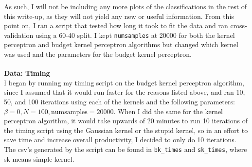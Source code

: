 \documentclass[submit]{harvardml}
\begin{document}
As such, I will not be including any more plots of the classifications in the rest of this write-up, as they will not yield any new or useful information. From this point on, I ran a script that tested how long it took to fit the data and ran cross-validation using a 60-40 split. I kept \texttt{numsamples} at 20000 for both the kernel perceptron and budget kernel perceptron algorithms but changed which kernel was used and the parameters for the budget kernel perceptron.\\ \\
\noindent\textbf{Data: Timing} \\
I began by running my timing script on the budget kernel perceptron algorithm, since I assumed that it would run faster for the reasons listed above, and ran 10, 50, and 100 iterations using each of the kernels and the following parameters: $\beta = 0, N = 100, \text{numsamples} = 20000$. When I did the same for the kernel perceptron algorithm, it would take upwards of 20 minutes to run 10 iterations of the timing script using the Gaussian kernel or the stupid kernel, so in an effort to save time and increase overall productivity, I decided to only do 10 iterations. The csv's generated by the script can be found in \texttt{bk\_times} and \texttt{sk\_times}, where sk means simple kernel.
\end{document}
